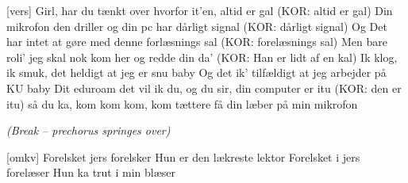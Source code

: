 \documentclass[a4paper,11pt]{article}
\begin{document}
\begin{song}
  [vers] Girl, har du tænkt over hvorfor it'en, altid er gal (KOR: altid er gal)
  Din mikrofon den driller og din pc har dårligt signal (KOR: dårligt signal)
  Og Det har intet at gøre med denne forlæsnings sal (KOR: forelæsnings sal)
  Men bare roli' jeg skal nok kom her og redde din da' (KOR: Han er lidt af en kal)
  Ik klog, ik smuk, det heldigt at jeg er snu baby
  Og det ik' tilfældigt at jeg arbejder på KU baby
  Dit eduroam det vil ik du, og du sir, din computer er itu (KOR: den er itu)
  så du ka, kom kom kom, kom tættere få din læber på min mikrofon

  {\it (Break -- prechorus springes over)}

  [omkv] Forelsket jers forelsker
  Hun er den lækreste lektor
  Forelsket i jers forelæser
  Hun ka trut i min blæser
\end{song}

\end{document}
